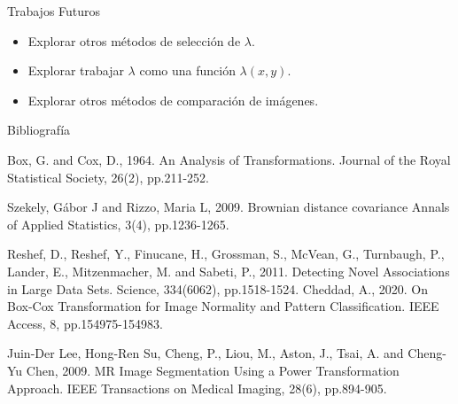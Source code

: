 \documentclass{beamer}
\begin{document}
\begin{frame}{Trabajos Futuros}
    \begin{itemize}
        \item Explorar otros métodos de selección de $\lambda$. 
        \item Explorar trabajar $\lambda$ como una función $\lambda(x, y)$.
        \item Explorar otros métodos de comparación de imágenes.
    \end{itemize}
    
\end{frame}


\begin{frame}{Bibliografía}
    \begin{thebibliography}{9}
    Box, G. and Cox, D., 1964. An Analysis of Transformations. Journal of the Royal Statistical Society, 26(2), pp.211-252.
    
    Szekely, G\'abor J and Rizzo, Maria L, 2009. Brownian distance covariance Annals of Applied Statistics, 3(4), pp.1236-1265.

    Reshef, D., Reshef, Y., Finucane, H., Grossman, S., McVean, G., Turnbaugh, P., Lander, E., Mitzenmacher, M. and Sabeti, P., 2011. Detecting Novel Associations in Large Data Sets. Science, 334(6062), pp.1518-1524.
    Cheddad, A., 2020. On Box-Cox Transformation for Image Normality and Pattern Classification. IEEE Access, 8, pp.154975-154983.
    
    Juin-Der Lee, Hong-Ren Su, Cheng, P., Liou, M., Aston, J., Tsai, A. and Cheng-Yu Chen, 2009. MR Image Segmentation Using a Power Transformation Approach. IEEE Transactions on Medical Imaging, 28(6), pp.894-905.
    \end{thebibliography}
\end{frame}
\end{document}
